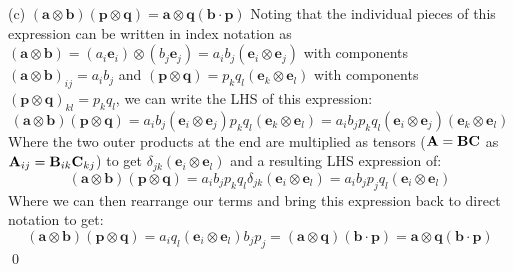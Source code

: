 \medskip
(c) $(\bm{a} \otimes \bm{b})(\bm{p} \otimes \bm{q}) = \bm{a}\otimes\bm{q}(\bm{b} \cdot \bm{p}) $ \newline
Noting that the individual pieces of this expression can be written in index notation as $(\bm{a} \otimes \bm{b}) = (a_i\bm{e}_i) \otimes (b_j\bm{e}_j) = a_ib_j(\bm{e}_i \otimes\bm{e}_j)$ with components $(\bm{a} \otimes \bm{b})_{ij} = a_ib_j$ and $(\bm{p} \otimes \bm{q}) = p_kq_l(\bm{e}_k \otimes\bm{e}_l)$ with components $(\bm{p} \otimes \bm{q})_{kl} = p_kq_l$, we can write the LHS of this expression:
\begin{equation}
    (\bm{a} \otimes \bm{b})(\bm{p} \otimes \bm{q}) = a_ib_j(\bm{e}_i \otimes\bm{e}_j)p_kq_l(\bm{e}_k \otimes\bm{e}_l) = a_ib_jp_kq_l(\bm{e}_i \otimes\bm{e}_j)(\bm{e}_k \otimes\bm{e}_l)
\end{equation}
Where the two outer products at the end are multiplied as tensors ($\mathbf{A}=\mathbf{B}\mathbf{C}$ as $\mathbf{A}_{ij} = \mathbf{B}_{ik}\mathbf{C}_{kj}$) to get $\delta_{jk}(\bm{e}_i \otimes\bm{e}_l)$ and a resulting LHS expression of:
\begin{equation}
    (\bm{a} \otimes \bm{b})(\bm{p} \otimes \bm{q}) = a_ib_jp_kq_l\delta_{jk}(\bm{e}_i \otimes\bm{e}_l) = a_ib_jp_jq_l(\bm{e}_i \otimes\bm{e}_l)
\end{equation}
Where we can then rearrange our terms and bring this expression back to direct notation to get:
\begin{equation}
    (\bm{a} \otimes \bm{b})(\bm{p} \otimes \bm{q}) = a_iq_l(\bm{e}_i \otimes\bm{e}_l)b_jp_j = (\bm{a} \otimes \bm{q})(\bm{b} \cdot\bm{p}) = \bm{a} \otimes \bm{q}(\bm{b} \cdot\bm{p})
\end{equation} \qed



